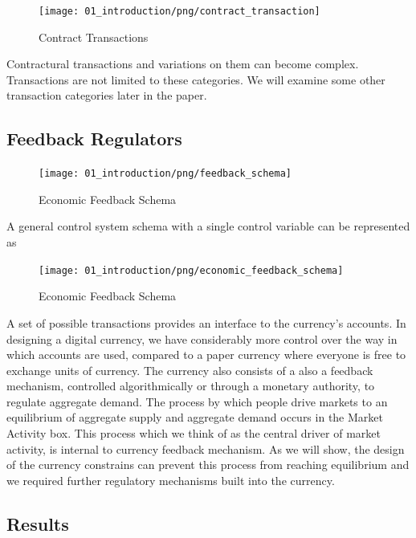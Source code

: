 \begin{figure}[H]
\centering
\texttt{[image: 01\_introduction/png/contract\_transaction]}
\caption{Contract Transactions}
\label{fig:contract_transaction1}
\end{figure}

Contractural transactions and variations on them can become complex. Transactions are not limited to
these categories. We will examine some other transaction categories later in the paper.

\subsection{Feedback Regulators}

\begin{figure}[H]
\centering
\texttt{[image: 01\_introduction/png/feedback\_schema]}
\caption{Economic Feedback Schema}
\label{fig:feedback_schema1}
\end{figure}

A general control system schema with a single control variable can be represented as

\begin{figure}[H]
\centering
\texttt{[image: 01\_introduction/png/economic\_feedback\_schema]}
\caption{Economic Feedback Schema}
\label{fig:economic_feedback_schema1}
\end{figure}

A set of possible transactions provides an interface to the currency's accounts. In designing a
digital currency, we have considerably more control over the way in which accounts are used,
compared to a paper currency where everyone is free to exchange units of currency. The currency also
consists of a 
also a feedback mechanism, controlled algorithmically or through a monetary authority, to regulate
aggregate demand. The process by which people drive markets to an equilibrium of aggregate supply
and aggregate demand occurs in the Market Activity box. This process which we think of as the
central driver of market activity, is internal to currency feedback mechanism. As we will show, the
design of the currency constrains can prevent this process from reaching equilibrium and we
required further regulatory mechanisms built into the currency.

\subsection{Results}

